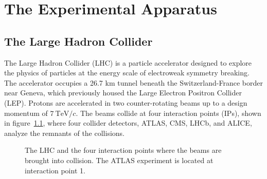 \chapter{The Experimental Apparatus}\label{ch:experiment}

\section{The Large Hadron Collider}\label{sec:lhc}
The Large Hadron Collider (LHC) is a particle accelerator designed to explore the physics of particles at the energy scale of electroweak symmetry breaking. The accelerator occupies a 26.7 km tunnel beneath the Switzerland-France border near Geneva, which previously housed the Large Electron Positron Collider (LEP). Protons are accelerated in two counter-rotating beams up to a design momentum of $7~\mbox{TeV}/c$. The beams collide at four interaction points (IPs), shown in figure~\ref{fig:LHC-IPs}, where four collider detectors, ATLAS, CMS, LHCb, and ALICE, analyze the remnants of the collisions.

\begin{figure}[htbp]
	\centering
	\caption{The LHC and the four interaction points where the beams are brought into collision. The ATLAS experiment is located at interaction point 1.}
	\label{fig:LHC-IPs}
\end{figure}


